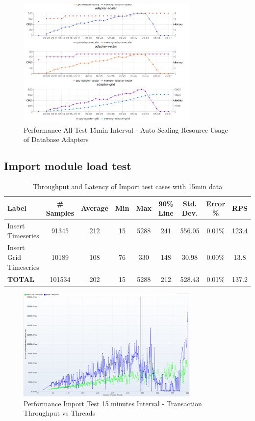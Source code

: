 \begin{figure}[htp]
    \centering
    \includegraphics[width=0.8\textwidth]{results/obs/all_auto/obs_all_auto_15m_adapter_dbs_res.png}
    \caption{Performance All Test 15min Interval - Auto Scaling Resource Usage of Database Adapters }
    \label{fi:obs_all_auto_15m_adapter_dbs_res}
\end{figure}


\subsection{Import module load test}
\begin{table}[]
\begin{tabulary}{\linewidth}{|L|C|C|C|C|C|C|C|C|}
\hline
Label & \# Samples & Average & Min & Max & 90\% Line & Std. Dev. & Error \% & RPS \\ \hline
Insert Timeseries & 91345 & 212 & 15 & 5288 & 241 & 556.05 & 0.01\% & 123.4 \\ \hline
Insert Grid Timeseries & 10189 & 108 & 76 & 330 & 148 & 30.98 & 0.00\% & 13.8 \\ \hline
\textbf{TOTAL} & 101534 & 202 & 15 & 5288 & 212 & 528.43 & 0.01\% & 137.2 \\ \hline
\end{tabulary}
\caption{Throughput and Latency of Import test cases with 15min data}
\label{tab:obs_import_15_min_summary}
\end{table}

\begin{figure}[htp]
    \centering
    \includegraphics[width=0.8\textwidth]{results/obs/import/obs_import_15m_transaction_throughtput_vs_threads.png}
    \caption{Performance Import Test 15 minutes Interval - Transaction Throughput vs Threads}
    \label{fi:test_obs_import_15m_throughtput}
\end{figure}

